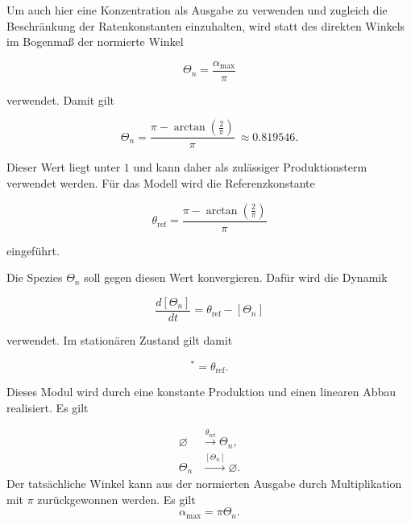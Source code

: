 Um auch hier eine Konzentration als Ausgabe zu verwenden und zugleich die
Beschränkung der Ratenkonstanten einzuhalten, wird statt des direkten Winkels im Bogenmaß der normierte Winkel

\begin{equation}
    \Theta_n
    =
    \frac{\alpha_{\max}}{\pi}
\end{equation}

verwendet. Damit gilt

\begin{equation}
    \Theta_n
    =
    \frac{
        \pi-\arctan\left(\frac{2}{\pi}\right)
    }{\pi}\
    \approx
    0.819546.
\end{equation}

Dieser Wert liegt unter \(1\) und kann daher als zulässiger Produktionsterm
verwendet werden. Für das Modell wird die Referenzkonstante

\begin{equation}
    \theta_{\mathrm{ref}}
    =
    \frac{
        \pi-\arctan\left(\frac{2}{\pi}\right)
    }{\pi}
    \label{eq:theta_ref}
\end{equation}

eingeführt.

Die Spezies \(\Theta_n\) soll gegen diesen Wert konvergieren. Dafür wird
die Dynamik

\begin{equation}
    \frac{d[\Theta_n]}{dt}
    =
    \theta_{\mathrm{ref}}-[\Theta_n]
    \label{eq:theta_dynamik}
\end{equation}

verwendet. Im stationären Zustand gilt damit

\begin{equation}
    [\Theta_n]^*=\theta_{\mathrm{ref}}.
\end{equation}

Dieses Modul wird durch eine konstante Produktion und einen linearen Abbau realisiert. Es gilt

\begin{equation}
\begin{aligned}
    \varnothing &\xrightarrow{\theta_{\mathrm{ref}}} \Theta_n,\\
    \Theta_n &\xrightarrow{[\Theta_n]} \varnothing.
\end{aligned}
\end{equation}
Der tatsächliche Winkel kann aus der normierten Ausgabe durch Multiplikation mit \(\pi\) zurückgewonnen werden. Es gilt 
\begin{equation}
    \alpha_{\max}=\pi\Theta_n.
\end{equation}
